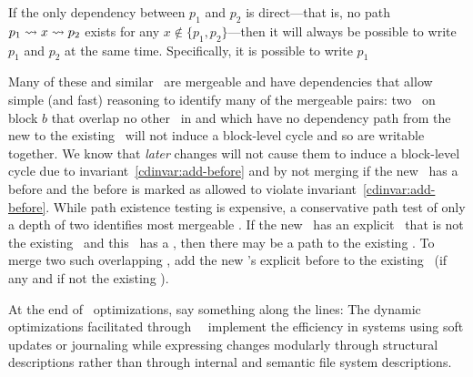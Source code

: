 %
If the only dependency between $p_1$ and $p_2$ is direct---that is, no path
$p_1 \leadsto x \leadsto p_2$ exists for any $x \not\in \{p_1,
p_2\}$---then it will always be possible to write $p_1$ and $p_2$ at the
same time.
%
Specifically, it is possible to write $p_1$ 


Many of these and similar \chdescs\ are mergeable and have
dependencies that allow simple (and fast) reasoning to identify many
of the mergeable pairs: two \chdescs\ on block $b$ that overlap no other \chdescs\ in \PMem[b]
and which have no dependency path from the new to the existing \chdesc\
will not induce a block-level cycle and so are writable together.
We know that \textit{later} changes will not cause them to induce a block-level cycle due to
invariant~\ref{cdinvar:add-before} and by not merging if the new \chdesc\
has a before and the before is marked as allowed to violate
invariant~\ref{cdinvar:add-before}.
%
While path existence testing is expensive, a conservative path test
of only a depth of two identifies most mergeable \chdescs. If the new
\chdesc\ has an explicit \before\ that is not the existing \chdesc\ and
this \before\ has a \before, then there may be a path to the existing
\chdesc.
%
To merge two such overlapping \chdescs, add the new \chdesc's explicit
before to the existing \chdesc\ (if any and if not the existing \chdesc).



At the end of \chdesc\ optimizations, say something along the lines:
%
The dynamic optimizations facilitated through \nrb\
\chdescs\ implement the efficiency in systems using soft updates or
journaling while expressing
changes modularly through structural descriptions rather than through
internal and semantic file system descriptions.

